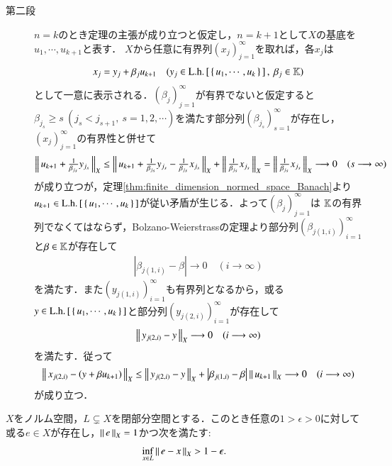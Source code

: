 \begin{prf}
\begin{description}
			\item[第二段]
				$n=k$のとき定理の主張が成り立つと仮定し，$n = k+1$として$X$の基底を$u_1,\cdots,u_{k+1}$と表す．
				$X$から任意に有界列$(x_j)_{j=1}^{\infty}$を取れば，各$x_j$は
				\begin{align}
					x_j = y_j + \beta_j u_{k+1} \quad (y_j \in \mathrm{L.h.}\left[\, \left\{\, u_1,\cdots,u_k\, \right\}\, \right],\ \beta_j \in \mathbb{K})
				\end{align}
				として一意に表示される．$(\beta_j)_{j=1}^{\infty}$が有界でないと仮定すると
				$\beta_{j_s} \geq s\ (j_s < j_{s+1},\ s=1,2,\cdots)$を満たす部分列$\left( \beta_{j_s} \right)_{s=1}^{\infty}$が存在し，
				$(x_j)_{j=1}^{\infty}$の有界性と併せて
				\begin{align}
					\left\|\, u_{k+1} + \tfrac{1}{\beta_{j_s}}y_{j_s}\, \right\|_{X}
					\leq \left\|\, u_{k+1} + \tfrac{1}{\beta_{j_s}}y_{j_s} - \tfrac{1}{\beta_{j_s}}x_{j_s}\, \right\|_{X}
						+ \left\|\, \tfrac{1}{\beta_{j_s}}x_{j_s}\, \right\|_{X}
					= \left\|\, \tfrac{1}{\beta_{j_s}}x_{j_s}\, \right\|_{X} \longrightarrow 0 \quad (s \longrightarrow \infty)
				\end{align}
				が成り立つが，定理\ref{thm:finite_dimension_normed_space_Banach}より
				$u_{k+1} \in \mathrm{L.h.}\left[\, \left\{\, u_1,\cdots,u_k\, \right\}\, \right]$が従い矛盾が生じる．よって$(\beta_j)_{j=1}^{\infty}$は
				$\mathbb{K}$の有界列でなくてはならず，Bolzano-Weierstrassの定理より部分列$\left( \beta_{j(1,i)} \right)_{i=1}^{\infty}$と$\beta \in \mathbb{K}$が存在して
				\begin{align}
					\left| \beta_{j(1,i)} - \beta \right| \longrightarrow 0 \quad (i \longrightarrow \infty)
				\end{align}
				を満たす．また$\left(y_{j(1,i)}\right)_{i=1}^{\infty}$も有界列となるから，或る
				$y \in \mathrm{L.h.}\left[\, \left\{\, u_1,\cdots,u_k\, \right\}\, \right]$と部分列$\left(y_{j(2,i)}\right)_{i=1}^{\infty}$が存在して
				\begin{align}
					\left\|\, y_{j(2,i)} - y\, \right\|_{X} \longrightarrow 0 \quad (i \longrightarrow \infty)
				\end{align}
				を満たす．従って
				\begin{align}
					\left\|\, x_{j(2,i)} - \left(y + \beta u_{k+1}\right)\, \right\|_{X} \leq
					\left\|\, y_{j(2,i)} - y\, \right\|_{X} + \left| \beta_{j(1,i)} - \beta \right| \left\|\, u_{k+1}\, \right\|_{X}
					\longrightarrow 0 \quad (i \longrightarrow \infty)
				\end{align}
				が成り立つ．
				\QED
		\end{description}
	\end{prf}
	
	\begin{screen}
		\begin{thm}[閉部分空間との点の距離]
			$X$をノルム空間，$L \subsetneq X$を閉部分空間とする．このとき任意の$1 > \epsilon > 0$に対して
			或る$e \in X$が存在し，$\left\|\, e\, \right\|_{X} = 1$かつ次を満たす:
			\begin{align}
				\operatorname*{inf}_{x \in L} \left\|\, e - x\, \right\|_{X} > 1 - \epsilon.
			\end{align}
			\label{thm:closed_subspace_distance}
		\end{thm}
	\end{screen}
	

